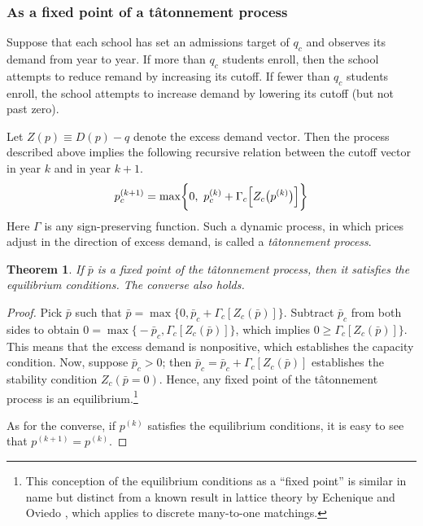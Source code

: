 \documentclass[12pt]{article}
\numberwithin{equation}{subsection}
\newtheorem{theorem}{Theorem}
\theoremstyle{definition}
\begin{document}
\subsubsection{As a fixed point of a t\^{a}tonnement process} \label{asafixedpoint}
Suppose that each school has set an admissions target of $q_c$ and observes its demand from year to year. If more than $q_c$ students enroll, then the school attempts to reduce remand by increasing its cutoff. If fewer than $q_c$ students enroll, the school attempts to increase demand by lowering its cutoff (but not past zero). 

Let $Z(p) \equiv D(p) - q$ denote the excess demand vector. Then the process described above implies the following recursive relation between the cutoff vector in year $k$ and in year $k+1$.
\begin{align} \label{tatonnementdef}
p_c^{(k+1)} = \max\biggl\{0,~p_c^{(k)}+ \Gamma_c\Bigl[Z_c\bigl(p^{(k)}\bigr)\Bigr] \biggr\}
\end{align}
Here $\Gamma$ is any sign-preserving function. Such a dynamic process, in which prices adjust in the direction of excess demand, is called a \emph{t\^{a}tonnement process}.
\begin{theorem}
If $\bar p$ is a fixed point of the t\^{a}tonnement process, then it satisfies the equilibrium conditions. The converse also holds.
\end{theorem}
\begin{proof} Pick $\bar p$ such that $\bar p = \max\bigl\{0, \bar p_c + \Gamma_c\left[Z_c(\bar p)\right] \bigr\}$. Subtract $\bar p_c$ from both sides to obtain $0 = \max\bigl\{-\bar p_c,\Gamma_c\left[Z_c(\bar p)\right] \bigr\}$, which implies $0 \geq \Gamma_c\left[Z_c(\bar p)\right] \bigr\}$. This means that the excess demand is nonpositive, which establishes the capacity condition. Now, suppose $\bar p_c > 0$; then $\bar p_c =  \bar p_c + \Gamma_c\left[Z_c(\bar p)\right] $ establishes the stability condition $Z_c(\bar p = 0)$. Hence, any fixed point of the t\^{a}tonnement process is an equilibrium.\footnote{This conception of the equilibrium conditions as a ``fixed point'' is similar in name but distinct from a known result in lattice theory by Echenique and Oviedo \parencite*{coremanytoonebyfixedpoint}, which applies to discrete many-to-one matchings.}

As for the converse, if $p^{(k)}$ satisfies the equilibrium conditions, it is easy to see that $p^{(k+1)} = p^{(k)}$. \end{proof}
\end{document}
